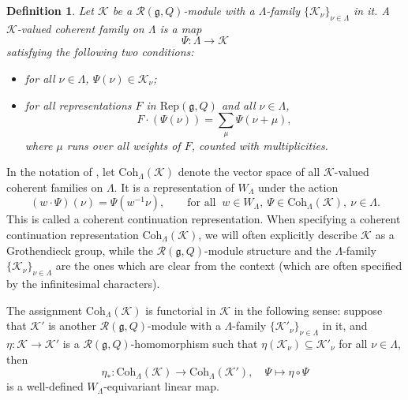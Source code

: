 \documentclass[12pt]{amsart}
\def\subset{\subseteq}
\newcommand{\CK}{{\mathcal {K}}}
\newcommand{\g}{\mathfrak g}
\numberwithin{equation}{section}
\newtheorem{defn}[thm]{Definition}
\theoremstyle{remark}
\def\Coh{\mathrm{Coh}}
\begin{document}
\begin{defn}\label{defcoh00}
  Let $\CK$ be  a $\mathcal R(\g, Q)$-module  with a $\Lambda$-family $\{\CK_\nu\}_{\nu\in \Lambda}$ in it.
  A $\CK$-valued coherent family on
  $\Lambda$ is a map
  \[
    \Psi: \Lambda\rightarrow \CK%
  \]
  satisfying the following two conditions:
  \begin{itemize}
    \item for all $\nu\in \Lambda$, $\Psi(\nu)\in \CK_\nu$;
    \item for all representations $F$ in $\mathrm{Rep}(\g, Q)$
          and all $\nu\in \Lambda$,
          \[
          F \cdot (\Psi(\nu)) = \sum_{\mu} \Psi(\nu+\mu),
          \]
          where $\mu$ runs over all weights of $F$, counted with multiplicities.%
  \end{itemize}
\end{defn}


In the notation of , let $\Coh_{\Lambda}(\CK)$ denote the
vector space of all $\mathcal K$-valued coherent families on $\Lambda$. It is a
representation of $W_{\Lambda}$ under the action
\[
  (w \cdot \Psi)(\nu) = \Psi(w^{-1} \nu), \qquad \textrm{for all
  }\ w\in W_\Lambda, \ \Psi\in \Coh_{\Lambda}(\CK), \   \nu\in \Lambda.
\]
This is called a coherent continuation representation. When specifying a coherent continuation representation $\Coh_{\Lambda}(\CK)$, we will often explicitly describe $\CK$ as a Grothendieck group, while the $\mathcal R(\g, Q)$-module structure and the $\Lambda$-family  $\{\CK_\nu\}_{\nu\in \Lambda}$ are the ones which are clear from the context (which are often specified by the infinitesimal characters).

The assignment $\Coh_{\Lambda}(\CK)$ is functorial in $\CK$ in the following sense: suppose that $\CK'$ is another  $\mathcal R(\g, Q)$-module  with a $\Lambda$-family $\{\CK'_\nu\}_{\nu\in \Lambda}$ in it, and $\eta: \CK\rightarrow \CK'$ is a $\mathcal R(\g, Q)$-homomorphism such that $\eta(\CK_\nu)\subset \CK'_\nu$ for all $\nu\in \Lambda$, then
\begin{equation}\label{eq:eta}
 \eta_*: \Coh_{\Lambda}(\CK)\rightarrow \Coh_{\Lambda}(\CK'), \quad \Psi\mapsto \eta\circ \Psi
\end{equation}
is a well-defined $W_\Lambda$-equivariant linear map.


\newcommand{\Rep}{\mathrm{Rep}}
\end{document}
